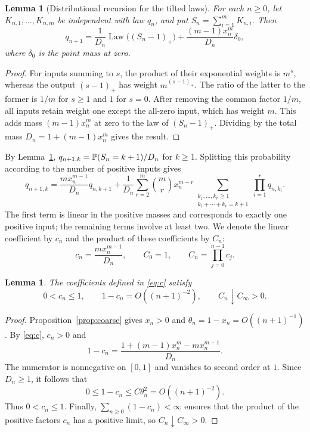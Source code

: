 \documentclass[11pt,letterpaper,reqno]{amsart}
\numberwithin{equation}{section}
\theoremstyle{plain}
\newtheorem{lemma}[theorem]{Lemma}
\theoremstyle{remark}
\begin{document}
\begin{lemma}[Distributional recursion for the tilted laws]\label{lem:tiltedlaw}
For each $n\ge0$, let $K_{n,1},\ldots,K_{n,m}$
be independent with law $q_n$, and put $S_n=\sum_{i=1}^mK_{n,i}$. Then
\[
 q_{n+1}
 =\frac1{D_n}\operatorname{Law}\bigl((S_n-1)_+\bigr)
  +\frac{(m-1)x_n^m}{D_n}\delta_0,
\]
where $\delta_0$ is the point mass at zero.
\end{lemma}
\begin{proof}
For inputs summing to $s$, the product of their exponential weights is $m^s$,
whereas the output $(s-1)_+$ has weight $m^{(s-1)_+}$. The ratio of the latter
to the former is $1/m$ for $s\ge1$ and $1$ for $s=0$. After removing the
common factor $1/m$, all inputs retain weight one except the all-zero input,
which has weight $m$. This adds mass $(m-1)x_n^m$ at zero to the law of
$(S_n-1)_+$. Dividing by the total mass $D_n=1+(m-1)x_n^m$ gives the result.
\end{proof}

By Lemma~\ref{lem:tiltedlaw}, $q_{n+1,k}=\mathbb P(S_n=k+1)/D_n$ for $k\ge1$.
Splitting this probability according to the number of positive inputs gives
\[
 q_{n+1,k}
 =\frac{mx_n^{m-1}}{D_n}q_{n,k+1}
 +\frac1{D_n}\sum_{r=2}^m\binom mr x_n^{m-r}
 \sum_{\substack{k_1,\ldots,k_r\ge1\\k_1+\cdots+k_r=k+1}}
 \prod_{i=1}^r q_{n,k_i}.
\]
The first term is linear in the positive masses and corresponds to exactly one positive input; the remaining terms involve at least two.
We denote the linear coefficient by $c_n$ and the product of these coefficients by $C_n$:
\begin{equation}\label{eq:c}
 c_n=\frac{mx_n^{m-1}}{D_n},\qquad C_0=1,\qquad C_n=\prod_{j=0}^{n-1}c_j.
\end{equation}
\begin{lemma}\label{lem:transportcoefficients}
The coefficients defined in \eqref{eq:c} satisfy
\begin{equation}\label{eq:C}
 0<c_n\le1,\qquad 1-c_n=O((n+1)^{-2}),\qquad
 C_n\downarrow C_\infty>0.
\end{equation}
\end{lemma}
\begin{proof}
Proposition~\ref{prop:coarse} gives $x_n>0$ and
$\theta_n=1-x_n=O((n+1)^{-1})$. By \eqref{eq:c}, $c_n>0$ and
\[
 1-c_n=\frac{1+(m-1)x_n^m-mx_n^{m-1}}{D_n}.
\]
The numerator is nonnegative on $[0,1]$ and vanishes to second order at $1$.
Since $D_n\ge1$, it follows that
\[
 0\le1-c_n\le C\theta_n^2=O((n+1)^{-2}).
\]
Thus $0<c_n\le1$. Finally, $\sum_{n\ge0}(1-c_n)<\infty$ ensures that
the product of the positive factors $c_n$ has a positive limit,
so $C_n\downarrow C_\infty>0$.
\end{proof}
\end{document}
